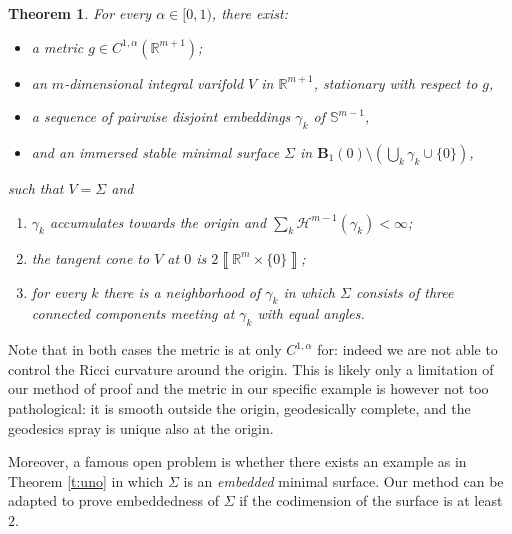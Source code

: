 \documentclass[reqno]{amsart}
\newtheorem{theorem}{Theorem}[section]
\theoremstyle{definition}
\theoremstyle{remark}
\numberwithin{equation}{section}
\newcommand{\R}{\mathbb{R}}
\def\a#1{\left\llbracket{#1}\right\rrbracket}
\begin{document}

\begin{theorem}\label{t:due} For every $\alpha \in [0,1)$, there exist:
\begin{itemize}
    \item[(a)] a metric $g\in C^{1,\alpha}(\R^{m+1})$; 
    \item[(b)] an $m$-dimensional integral varifold $V$ in $\R^{m+1}$, stationary with respect to $g$, 
    \item[(c)] a sequence of pairwise disjoint embeddings $\gamma_k$ of $\mathbb S^{m-1}$,
    \item[(d)] and an immersed stable minimal surface $\Sigma$ in $\mathbf{B}_1 (0) \setminus (\bigcup_k \gamma_k \cup \{0\})$,
\end{itemize}    
such that $V= \Sigma$ and
\begin{enumerate}
    \item $\gamma_k$ accumulates towards the origin and $\sum_k \mathcal{H}^{m-1} (\gamma_k) < \infty$; 
    \item the tangent cone to $V$ at $0$ is $2 \a{\R^m\times \{0\}}$;
    \item for every $k$ there is a neighborhood of $\gamma_k$ in which $\Sigma$ consists of three connected components meeting at $\gamma_k$ with equal angles.
\end{enumerate}
\end{theorem}

Note that in both cases the metric is at only $C^{1,\alpha}$ for: indeed we are not able to control the Ricci curvature around the origin. This is likely only a limitation of our method of proof and the metric in our specific example is however not too pathological: it is smooth outside the origin, geodesically complete, and the geodesics spray is unique also at the origin.

Moreover, a famous open problem is whether there exists an example as in Theorem \ref{t:uno} in which $\Sigma$ is an {\em embedded} minimal surface. Our method can be adapted to prove embeddedness of $\Sigma$ if the codimension of the surface is at least $2$. 
\end{document}
